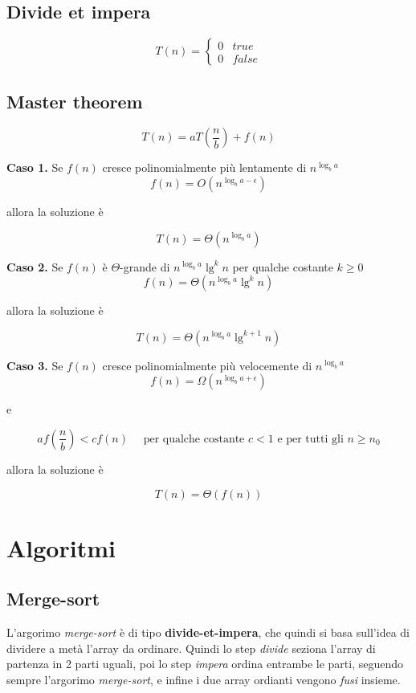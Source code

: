 \documentclass{article}
\begin{document}
\pagebreak

\subsection{Divide et impera}

\begin{equation}
    T(n) =
    \begin{cases}
        0 & true  \\
        0 & false
    \end{cases}
\end{equation}

\subsection{Master theorem}
\[T(n) = aT\left(\frac{n}{b}\right) + f(n)\]

\textbf{Caso 1.}
Se \(f(n)\) cresce polinomialmente più lentamente di \(n^{\log_b a}\)
\[f(n) = O\left(n^{\log_b a - \epsilon}\right)\]
\begin{center}allora la soluzione è\end{center}
\[T(n) = \Theta\left(n^{\log_b a}\right)\]

\vspace{1cm}

\textbf{Caso 2.}
Se \(f(n)\) è \(\Theta\)-grande di \(n^{\log_b a}\lg^k n\) per qualche costante \(k \geq 0\)
\[f(n) = \Theta\left(n^{\log_b a}\lg^k n\right)\]
\begin{center}allora la soluzione è\end{center}
\[T(n) = \Theta\left(n^{\log_b a} \lg^{k+1} n\right)\]

\vspace{1cm}

\textbf{Caso 3.}
Se \(f(n)\) cresce polinomialmente più velocemente di \(n^{\log_b a}\)
\[f(n) = \Omega\left(n^{\log_b a + \epsilon}\right)\]
\begin{center}e\end{center}
\[a f(\frac{n}{b}) < c f(n) \quad \text{ per qualche costante } c < 1 \text{ e per tutti gli } n \geq n_0\]
\begin{center}allora la soluzione è\end{center}
\[T(n) = \Theta\left(f(n)\right)\]

\section{Algoritmi}
\subsection{Merge-sort}
L'argorimo \emph{merge-sort} è di tipo \textbf{divide-et-impera}, che quindi si basa sull'idea di dividere a metà l'array da ordinare.
Quindi lo step \emph{divide} seziona l'array di partenza in 2 parti uguali, poi lo step \emph{impera} ordina entrambe le parti, seguendo sempre l'argorimo \emph{merge-sort}, e infine i due array ordianti vengono \emph{fusi} insieme.
\end{document}
